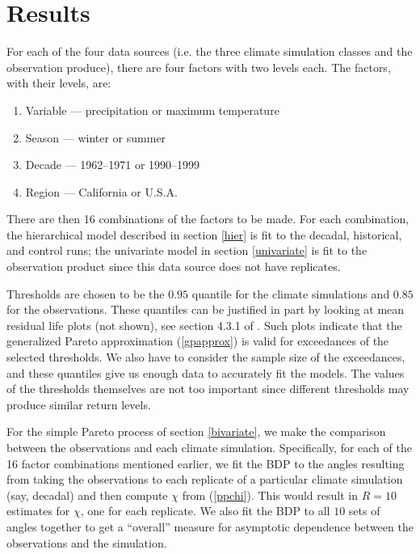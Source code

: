 \section{Results}
\label{results}

For each of the four data sources (i.e. the three climate simulation classes and the observation produce), there are four factors with two levels each. The factors, with their levels, are:
\begin{enumerate}
\item Variable --- precipitation or maximum temperature
\item Season --- winter or summer
\item Decade --- 1962--1971 or 1990--1999
\item Region --- California or U.S.A.
\end{enumerate}
There are then 16 combinations of the factors to be made. For each combination, the hierarchical model described in section \ref{hier} is fit to the decadal, historical, and control runs; the univariate model in section \ref{univariate} is fit to the observation product since this data source does not have replicates.

Thresholds are chosen to be the $0.95$ quantile for the climate simulations and $0.85$ for the observations. These quantiles can be justified in part by looking at mean residual life plots (not shown), see section 4.3.1 of \cite{coles2001introduction}. Such plots indicate that the generalized Pareto approximation (\ref{gpapprox}) is valid for exceedances of the selected thresholds. We also have to consider the sample size of the exceedances, and these quantiles give us enough data to accurately fit the models. The values of the thresholds themselves are not too important since different thresholds may produce similar return levels.

For the simple Pareto process of section \ref{bivariate}, we make the comparison between the observations and each climate simulation. Specifically, for each of the 16 factor combinations mentioned earlier, we fit the BDP to the angles resulting from taking the observations to each replicate of a particular climate simulation (say, decadal) and then compute $\chi$ from (\ref{ppchi}). This would result in $R=10$ estimates for $\chi$, one for each replicate. We also fit the BDP to all $10$ sets of angles together to get a ``overall'' measure for asymptotic dependence between the observations and the simulation.

